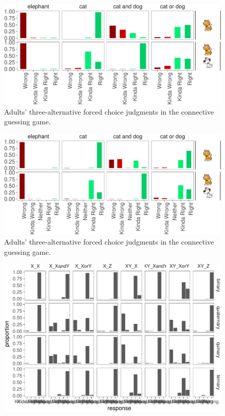 \documentclass[floatsintext,man]{apa6}
\theoremstyle{definition}
\theoremstyle{definition}
\theoremstyle{definition}
\theoremstyle{remark}
\begin{document}
\begin{figure}[t]

{\centering \includegraphics{writeup_files/figure-latex/quaternaryPlot-1} 

}

\caption{Adults' three-alternative forced choice judgments in the connective guessing game.}\label{fig:quaternaryPlot}
\end{figure}

\begin{figure}[t]

{\centering \includegraphics{writeup_files/figure-latex/quinaryPlot-1} 

}

\caption{Adults' three-alternative forced choice judgments in the connective guessing game.}\label{fig:quinaryPlot}
\end{figure}

\begin{figure}
\centering
\includegraphics{writeup_files/figure-latex/unnamed-chunk-2-1.pdf}
\caption{}
\end{figure}
\end{document}
